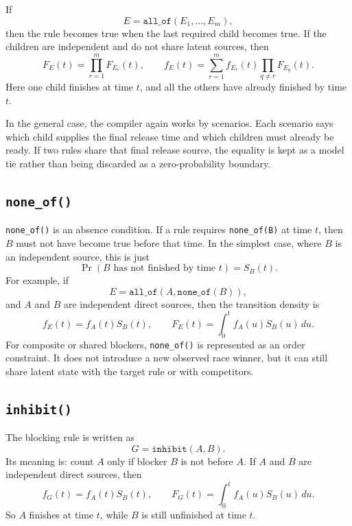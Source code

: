 \documentclass[11pt]{article}
\begin{document}
If
\[
E = \texttt{all\_of}(E_1,\dots,E_m),
\]
then the rule becomes true when the last required child becomes true. If the
children are independent and do not share latent sources, then
\begin{equation}
F_E(t) = \prod_{r=1}^m F_{E_r}(t),
\qquad
f_E(t) = \sum_{r=1}^m f_{E_r}(t)\prod_{q \ne r} F_{E_q}(t).
\label{eq:all-of}
\end{equation}
Here one child finishes at time $t$, and all the others have already finished
by time $t$.

In the general case, the compiler again works by scenarios. Each scenario says
which child supplies the final release time and which children must already be
ready. If two rules share that final release source, the equality is kept as a
model tie rather than being discarded as a zero-probability boundary.

\subsection{\texttt{none\_of()}}

\texttt{none\_of()} is an absence condition. If a rule requires
\texttt{none\_of(B)} at time $t$, then $B$ must not have become true before
that time. In the simplest case, where $B$ is an independent source, this is
just
\[
\Pr(B \text{ has not finished by time } t) = S_B(t).
\]
For example, if
\[
E = \texttt{all\_of}(A,\texttt{none\_of}(B)),
\]
and $A$ and $B$ are independent direct sources, then the transition density is
\[
f_E(t) = f_A(t)S_B(t),
\qquad
F_E(t) = \int_0^t f_A(u)S_B(u)\,du.
\]
For composite or shared blockers, \texttt{none\_of()} is represented as an
order constraint. It does not introduce a new observed race winner, but it can
still share latent state with the target rule or with competitors.

\subsection{\texttt{inhibit()}}

The blocking rule is written as
\[
G = \texttt{inhibit}(A,B).
\]
Its meaning is: count $A$ only if blocker $B$ is not before $A$. If $A$ and
$B$ are independent direct sources, then
\begin{equation}
f_G(t) = f_A(t)S_B(t),
\qquad
F_G(t) = \int_0^t f_A(u)S_B(u)\,du.
\label{eq:guard-density}
\end{equation}
So $A$ finishes at time $t$, while $B$ is still unfinished at time $t$.
\end{document}
